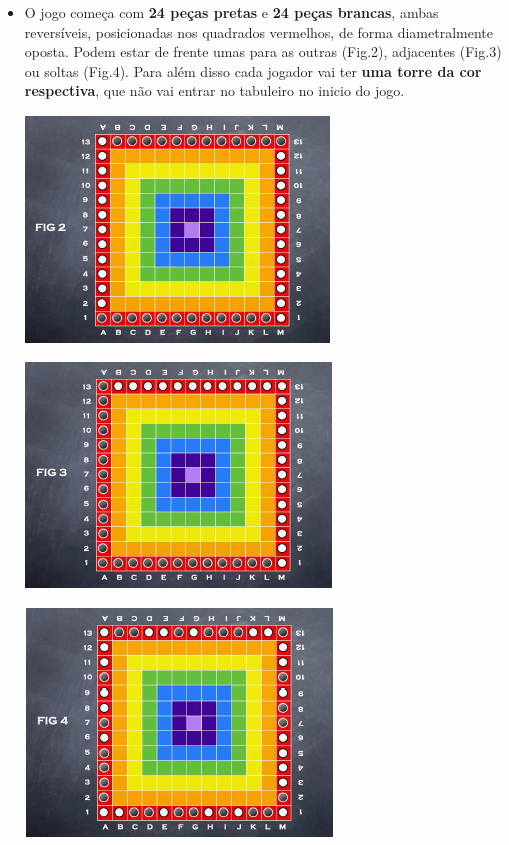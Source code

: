 \documentclass[a4paper]{article}
\begin{document}
\begin{itemize}
	\item O jogo começa com \textbf{24 peças pretas} e \textbf{24 peças brancas}, ambas reversíveis, posicionadas nos quadrados vermelhos, de forma diametralmente oposta. Podem estar de frente umas para as outras (Fig.2), adjacentes (Fig.3) ou soltas (Fig.4). Para além disso cada jogador vai ter \textbf{uma torre da cor respectiva}, que não vai entrar no tabuleiro no inicio do jogo. 
\begin{center}
\includegraphics[scale=0.9]{fig2.png}\linebreak\linebreak 
\end{center}

\begin{center}
\includegraphics[scale=0.9]{fig3.png}\linebreak\linebreak 
\end{center}

\begin{center}
\includegraphics[scale=0.9]{fig4.png}\linebreak\linebreak 
\end{center}


\end{itemize}
\end{document}
